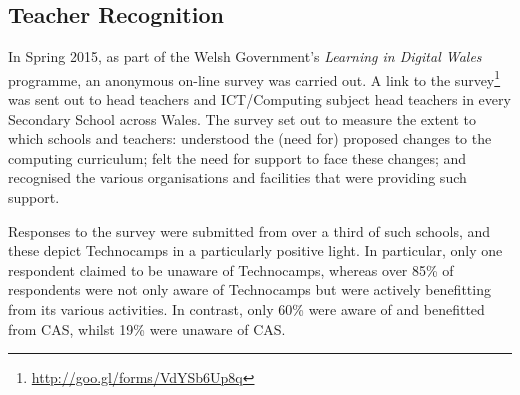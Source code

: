 \documentclass{sig-alternate}
\begin{document}

\subsection{Teacher Recognition}\label{teacherrecog}

In Spring 2015, as part of the Welsh Government's
\emph{Learning in Digital Wales} programme,
an anonymous on-line survey was carried out.
A link to the survey\footnote{\url{http://goo.gl/forms/VdYSb6Up8q}}
was sent out to head teachers and ICT/Computing subject head teachers
in every Secondary School across Wales.
The survey set out to measure the extent to which schools and teachers:
understood the (need for) proposed changes to the computing curriculum;
felt the need for support to face these changes;
and recognised the various organisations and facilities that were
providing such support.

Responses to the survey were submitted from over a third of such schools,
and these depict Technocamps in a particularly positive light.
In particular, only one respondent claimed to be unaware of Technocamps,
whereas over 85\% of respondents were not only aware of Technocamps
but were actively benefitting from its various activities.
In contrast, only 60\% were aware of and benefitted from CAS,
whilst 19\% were unaware of CAS.
\end{document}
